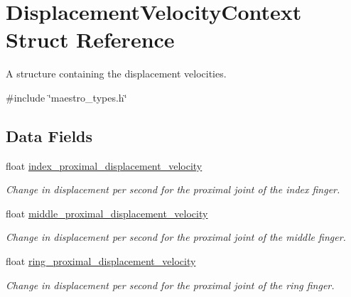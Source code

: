 \hypertarget{struct_displacement_velocity_context}{}\section{Displacement\+Velocity\+Context Struct Reference}
\label{struct_displacement_velocity_context}


A structure containing the displacement velocities.  




{\ttfamily \#include \char`\"{}maestro\+\_\+types.\+h\char`\"{}}

\subsection*{Data Fields}
\begin{DoxyCompactItemize}
\item 
\mbox{\label{struct_displacement_velocity_context_a16096585239e812e24500d9bb439f3c7}} 
float \hyperlink{struct_displacement_velocity_context_a16096585239e812e24500d9bb439f3c7}{index\+\_\+proximal\+\_\+displacement\+\_\+velocity}
\begin{DoxyCompactList}\small\item\em Change in displacement per second for the proximal joint of the index finger. \end{DoxyCompactList}\item 
\mbox{\label{struct_displacement_velocity_context_a946a6b7ceed6f5197b8c5c508e545853}} 
float \hyperlink{struct_displacement_velocity_context_a946a6b7ceed6f5197b8c5c508e545853}{middle\+\_\+proximal\+\_\+displacement\+\_\+velocity}
\begin{DoxyCompactList}\small\item\em Change in displacement per second for the proximal joint of the middle finger. \end{DoxyCompactList}\item 
\mbox{\label{struct_displacement_velocity_context_ad65b34d740fd49a716789fe64077790d}} 
float \hyperlink{struct_displacement_velocity_context_ad65b34d740fd49a716789fe64077790d}{ring\+\_\+proximal\+\_\+displacement\+\_\+velocity}
\begin{DoxyCompactList}\small\item\em Change in displacement per second for the proximal joint of the ring finger. \end{DoxyCompactList}\item 

\end{DoxyCompactItemize}
